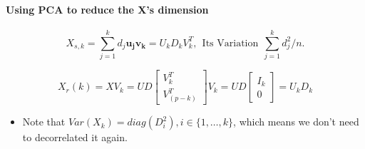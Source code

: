 \documentclass[]{article}
\providecommand{\tightlist}{%
  \setlength{\itemsep}{0pt}\setlength{\parskip}{0pt}}
\let\oldparagraph\paragraph
\renewcommand{\paragraph}[1]{\oldparagraph{#1}\mbox{}}
\begin{document}
\paragraph{Using PCA to reduce the X's
dimension}\label{using-pca-to-reduce-the-xs-dimension}

\[
  X_{s,k} = \sum_{j=1}^{k}d_j\pmb{u_jv_k} = U_kD_kV_k^T,~~ \text{Its Variation} ~~  \sum_{j=1}^kd_j^2/n.
\]

\[
  X_r(k) = XV_k = UD \begin{bmatrix} 
                      V_k^T \\
                      V_{(p-k)}^T 
                      \end{bmatrix} V_k=  UD \begin{bmatrix} 
                                                  I_k \\
                                                  0 
                                                \end{bmatrix}= U_kD_k
\]

\begin{itemize}
\tightlist
\item
  Note that \(Var(X_k) = diag(D_i^2), i \in \{1, \dots, k\}\), which
  means we don't need to decorrelated it again.
\end{itemize}
\end{document}
